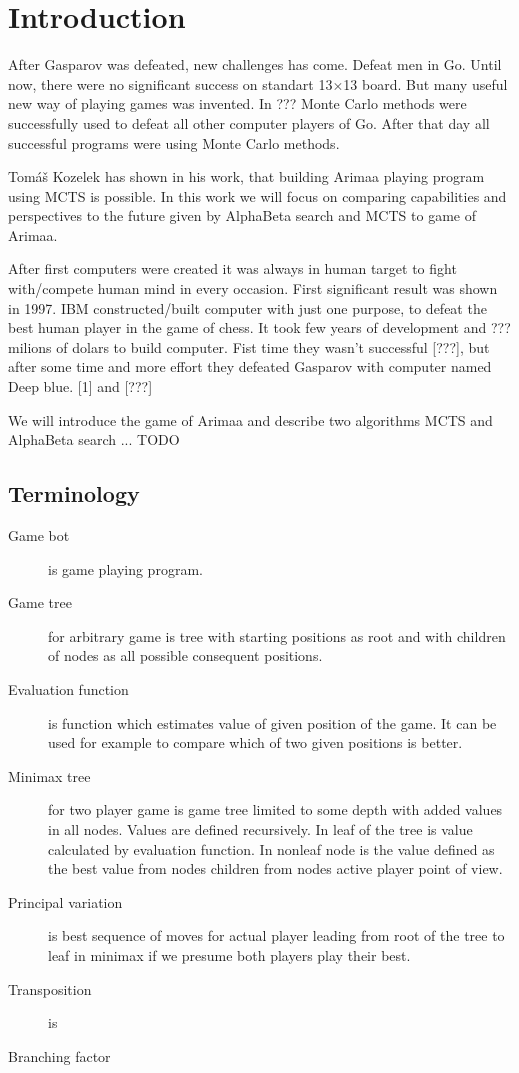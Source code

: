 
\chapter{Introduction}
After Gasparov was defeated, new challenges has come. Defeat men in Go. Until
now, there were no significant success on standart 13$\times$13 board. But many
useful new way of playing games was invented. In ??? Monte Carlo methods were
successfully used to defeat all other computer players of Go. After that day
all successful programs were using Monte Carlo methods.

Tomáš Kozelek has shown in his work, that building Arimaa playing program using
MCTS is possible. In this work we will focus on comparing capabilities and
perspectives to the future given by AlphaBeta search and MCTS to game of
Arimaa.

After first computers were created it was always in human target to fight
with/compete human mind in every occasion. First significant result was shown
in 1997. IBM constructed/built computer with just one purpose, to defeat
the best human player in the game of chess. It took few years of development
and ??? milions of dolars to build computer. Fist time they wasn't successful
[???], but after some time and more effort they defeated Gasparov with computer
named Deep blue.
[1] and [???]

We will introduce the game of Arimaa and describe two algorithms \ac{MCTS} and AlphaBeta search ... TODO


\section{Terminology}
\begin{description}
\item[Game bot] is game playing program.
\item[Game tree] for arbitrary game is tree with starting positions as root and
   with children of nodes as all possible consequent positions.
\item[Evaluation function] is function which estimates value of given position of the game. It can be used for example to compare which of two given positions is better.
\item[Minimax tree] for two player game is game tree limited to some depth with
added values in all nodes. Values are defined recursively. In leaf of the tree
is value calculated by evaluation function. In nonleaf node is the value
defined as the best value from nodes children from nodes active player point
of view.
\item[Principal variation] is best sequence of moves for actual player leading
from root of the tree to leaf in minimax if we presume both players play their
best.
\item[Transposition] is 
\item[Branching factor] 
\end{description}

